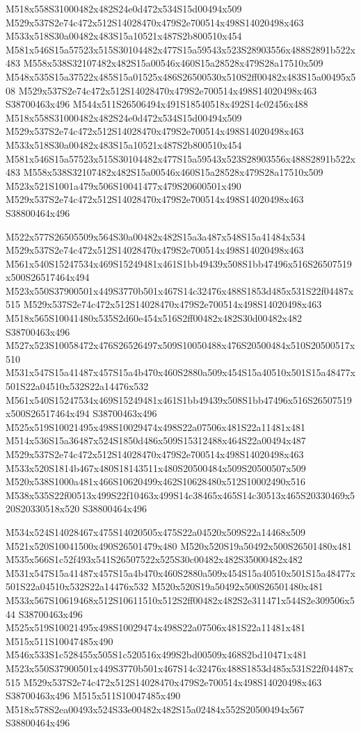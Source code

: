 \documentclass{article}
\begin{document}
\begin{multicols}{2}
M518x558S31000482x482S24e0d472x534S15d00494x509 M529x537S2e74c472x512S14028470x479S2e700514x498S14020498x463 M533x518S30a00482x483S15a10521x487S2b800510x454 M581x546S15a57523x515S30104482x477S15a59543x523S28903556x488S2891b522x483 M558x538S32107482x482S15a00546x460S15a28528x479S28a17510x509 M548x535S15a37522x485S15a01525x486S26500530x510S2ff00482x483S15a00495x508 M529x537S2e74c472x512S14028470x479S2e700514x498S14020498x463 S38700463x496 M544x511S26506494x491S18540518x492S14c02456x488 M518x558S31000482x482S24e0d472x534S15d00494x509 M529x537S2e74c472x512S14028470x479S2e700514x498S14020498x463 M533x518S30a00482x483S15a10521x487S2b800510x454 M581x546S15a57523x515S30104482x477S15a59543x523S28903556x488S2891b522x483 M558x538S32107482x482S15a00546x460S15a28528x479S28a17510x509 M523x521S1001a479x506S10041477x479S20600501x490 M529x537S2e74c472x512S14028470x479S2e700514x498S14020498x463 S38800464x496

M522x577S26505509x564S30a00482x482S15a3a487x548S15a41484x534 M529x537S2e74c472x512S14028470x479S2e700514x498S14020498x463 M561x540S15247534x469S15249481x461S1bb49439x508S1bb47496x516S26507519x500S26517464x494 M523x550S37900501x449S3770b501x467S14c32476x488S1853d485x531S22f04487x515 M529x537S2e74c472x512S14028470x479S2e700514x498S14020498x463 M518x565S10041480x535S2d60e454x516S2ff00482x482S30d00482x482 S38700463x496 M527x523S10058472x476S26526497x509S10050488x476S20500484x510S20500517x510 M531x547S15a41487x457S15a4b470x460S2880a509x454S15a40510x501S15a48477x501S22a04510x532S22a14476x532 M561x540S15247534x469S15249481x461S1bb49439x508S1bb47496x516S26507519x500S26517464x494 S38700463x496 M525x519S10021495x498S10029474x498S22a07506x481S22a11481x481 M514x536S15a36487x524S1850d486x509S15312488x464S22a00494x487 M529x537S2e74c472x512S14028470x479S2e700514x498S14020498x463 M533x520S1814b467x480S18143511x480S20500484x509S20500507x509 M520x538S1000a481x466S10620499x462S10628480x512S10002490x516 M538x535S22f00513x499S22f10463x499S14c38465x465S14c30513x465S20330469x520S20330518x520 S38800464x496

M534x524S14028467x475S14020505x475S22a04520x509S22a14468x509 M521x520S10041500x490S26501479x480 M520x520S19a50492x500S26501480x481 M535x566S1c52f493x541S26507522x525S30c00482x482S35000482x482 M531x547S15a41487x457S15a4b470x460S2880a509x454S15a40510x501S15a48477x501S22a04510x532S22a14476x532 M520x520S19a50492x500S26501480x481 M533x567S10619468x512S10611510x512S2ff00482x482S2e311471x544S2e309506x544 S38700463x496 M525x519S10021495x498S10029474x498S22a07506x481S22a11481x481 M515x511S10047485x490 M546x533S1c528455x505S1c520516x499S2bd00509x468S2bd10471x481 M523x550S37900501x449S3770b501x467S14c32476x488S1853d485x531S22f04487x515 M529x537S2e74c472x512S14028470x479S2e700514x498S14020498x463 S38700463x496 M515x511S10047485x490 M518x578S2ea00493x524S33e00482x482S15a02484x552S20500494x567 S38800464x496


\end{multicols}
\end{document}
